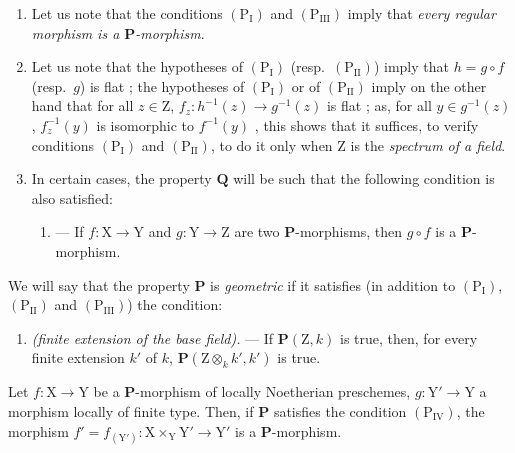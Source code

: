 \begin{remarks}[7.3.5]
\label{IV.7.3.5}
\begin{enumerate}[label=\emph{\roman*)}]
  \item Let us note that the conditions $(\mathrm{P_I})$ and $(\mathrm{P_{III}})$ imply that \emph{every regular morphism is a $\boldsymbol{P}$-morphism}.

  \item Let us note that the hypotheses of $(\mathrm{P_I})$ (resp.~$(\mathrm{P_{II}})$) imply that $h=g\circ f$ (resp.~$g$) is flat ; the hypotheses of $(\mathrm{P_I})$ or of $(\mathrm{P_{II}})$ imply on the other hand that for all $z\in\mathrm{Z}$, $f_z:h^{-1}(z)\to g^{-1}(z)$ is flat ; as, for all $y\in g^{-1}(z)$, $f_z^{-1}(y)$ is isomorphic to $f^{-1}(y)$ , this shows that it suffices, to verify conditions $(\mathrm{P_I})$ and $(\mathrm{P_{II}})$, to do it only when $\mathrm{Z}$ is the \emph{spectrum of a field}.

  \item In certain cases, the property $\boldsymbol{Q}$ will be such that the following condition is also satisfied:
  \begin{enumerate}
    \item[$(\mathrm{P'_I})$] ---
    If $f:\mathrm{X}\to\mathrm{Y}$ and $g:\mathrm{Y}\to\mathrm{Z}$ are two $\boldsymbol{P}$-morphisms, then $g\circ f$ is a $\boldsymbol{P}$-morphism.
  \end{enumerate}
\end{enumerate}
\end{remarks}

\begin{env}[7.3.6]
\label{IV.7.3.6}
We will say that the property $\boldsymbol{P}$ is \emph{geometric} if it satisfies (in addition to $(\mathrm{P_I})$, $(\mathrm{P_{II}})$ and $(\mathrm{P_{III}})$) the condition:
\begin{enumerate}
  \item[$(\mathrm{P_{IV}})$] \emph{(finite extension of the base field).} ---
  If $\boldsymbol{P}(\mathrm{Z},k)$ is true, then, for every finite extension $k'$ of $k$, $\boldsymbol{P}(\mathrm{Z}\otimes_k k',k')$ is true.
\end{enumerate}
\end{env}

\begin{lemma}[7.3.7]
\label{IV.7.3.7}
Let $f:\mathrm{X}\to\mathrm{Y}$ be a $\boldsymbol{P}$-morphism of locally Noetherian preschemes, $g:\mathrm{Y}'\to\mathrm{Y}$ a morphism locally of finite type.
Then, if $\boldsymbol{P}$ satisfies the condition $(\mathrm{P_{IV}})$, the morphism $f'=f_{(\mathrm{Y}')}:\mathrm{X}\times_\mathrm{Y}\mathrm{Y}'\to\mathrm{Y}'$ is a $\boldsymbol{P}$-morphism.
\end{lemma}

